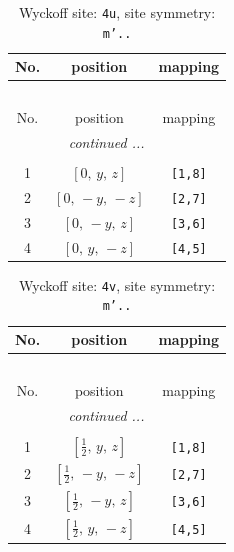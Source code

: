 \documentclass[fleqn,8pt]{jsarticle}
\begin{document}
\begin{longtable}{ccc}
\caption{Wyckoff site: {\tt 4u}, site symmetry: {\tt m'..}}
 \\
 \hline \hline
No. & position & mapping \\ \hline \endfirsthead

\multicolumn{2}{l}{\tablename\ \thetable{}} \\
 \hline \hline
No. & position & mapping \\ \hline \endhead

 \hline \hline
\multicolumn{2}{r}{\footnotesize\it continued ...} \\ \endfoot

 \hline \hline
\multicolumn{2}{r}{} \\ \endlastfoot

1 & $\left[ 0,\, y,\, z \right]$ & {\tt [1,8]} \\ \hline
2 & $\left[ 0,\, - y,\, - z \right]$ & {\tt [2,7]} \\ \hline
3 & $\left[ 0,\, - y,\, z \right]$ & {\tt [3,6]} \\ \hline
4 & $\left[ 0,\, y,\, - z \right]$ & {\tt [4,5]} \\
\end{longtable}
\renewcommand{\arraystretch}{1.2}
\begin{longtable}{ccc}
\caption{Wyckoff site: {\tt 4v}, site symmetry: {\tt m'..}}
 \\
 \hline \hline
No. & position & mapping \\ \hline \endfirsthead

\multicolumn{2}{l}{\tablename\ \thetable{}} \\
 \hline \hline
No. & position & mapping \\ \hline \endhead

 \hline \hline
\multicolumn{2}{r}{\footnotesize\it continued ...} \\ \endfoot

 \hline \hline
\multicolumn{2}{r}{} \\ \endlastfoot

1 & $\left[ \frac{1}{2},\, y,\, z \right]$ & {\tt [1,8]} \\ \hline
2 & $\left[ \frac{1}{2},\, - y,\, - z \right]$ & {\tt [2,7]} \\ \hline
3 & $\left[ \frac{1}{2},\, - y,\, z \right]$ & {\tt [3,6]} \\ \hline
4 & $\left[ \frac{1}{2},\, y,\, - z \right]$ & {\tt [4,5]} \\
\end{longtable}
\end{document}
